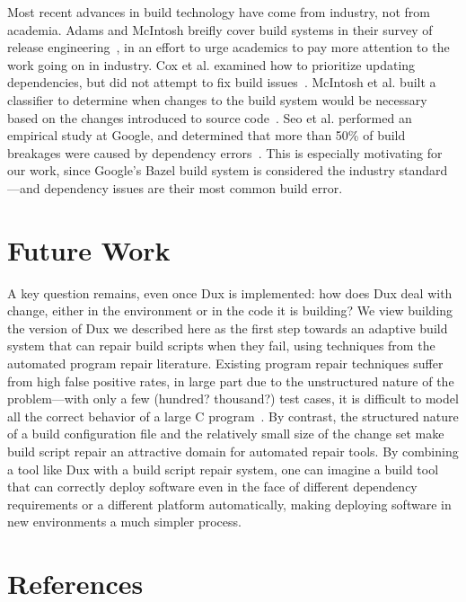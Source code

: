 \documentclass[10pt,conference]{IEEEtran}
\begin{document}
Most recent advances in build technology have come from industry, not from
academia. Adams and McIntosh breifly cover build systems in their survey of
release engineering~\cite{adams2016modern}, in an effort to urge academics to
pay more attention to the work going on in industry. Cox et al. examined how
to prioritize updating dependencies, but did not attempt to fix build issues~\cite{cox2015measuring}.
McIntosh et al. built a classifier to determine when changes to the build
system would be necessary based on the changes introduced to source code~\cite{mcintosh2014mining}.
Seo et al. performed an empirical study at Google, and determined that more
than 50\% of build breakages were caused by dependency errors~\cite{googlebuilderrors}.
This is especially motivating for our work, since Google's Bazel build system
is considered the industry standard---and dependency issues are their most
common build error.

\section{Future Work}
A key question remains, even once Dux is implemented: how does Dux deal with
change, either in the environment or in the code it is building? We view building
the version of Dux we described here as the first step towards an adaptive
build system that can repair build scripts when they fail, using techniques
from the automated program repair literature. Existing program repair techniques
suffer from high false positive rates, in large part due to the unstructured
nature of the problem---with only a few (hundred? thousand?) test cases, it is
difficult to model all the correct behavior of a large C program~\cite{genprogisbadrinard}.
By contrast, the structured nature of a build configuration file and the relatively
small size of the change set make build script repair an attractive domain for
automated repair tools. By combining a tool like Dux with a build script repair
system, one can imagine a build tool that can correctly deploy software even in
the face of different dependency requirements or a different platform automatically,
making deploying software in new environments a much simpler process.

\section{References}

\begingroup
\renewcommand{\section}[2]{}%



%
%
\endgroup
\end{document}
